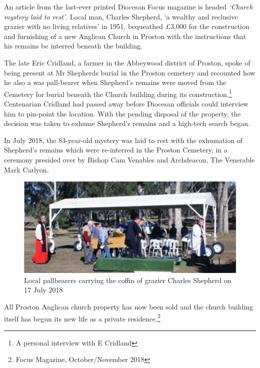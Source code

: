 An article from the last-ever printed Diocesan Focus magazine is headed \emph{`Church mystery laid to rest'}. Local man, Charles Shepherd, `a wealthy and reclusive grazier with no living relatives' in 1951, bequeathed \pounds3,000 for the construction and furnishing of a new Anglican Church in Proston with the instructions that his remains be interred beneath the building.



The late Eric Cridland, a farmer in the Abbeywood district of Proston, spoke of being present at Mr Shepherds burial in the Proston cemetery and recounted how he also a was pall-bearer when Shepherd's remains were moved from the Cemetery for burial beneath the Church building during its construction.\footnote{A personal interview with E Cridland} Centenarian Cridland had passed away before Diocesan officials could interview him to pin-point the location. With the pending disposal of the property, the decision was taken to exhume Shepherd's remains and a high-tech search began.


In July 2018, the 83-year-old mystery was laid to rest with the exhumation of Shepherd's remains which were re-interred in the Proston Cemetery, in a ceremony presided over by Bishop Cam Venables and Archdeacon, The Venerable Mark Carlyon.









\begin{figure}[!htb]
\begin{center}
\includegraphics[width=1.\textwidth,center]{../images/charlesShepherd.jpg}
\caption{Local pallbearers carrying the coffin of grazier Charles Shepherd on 17 July 2018}
\end{center}
\end{figure}




All Proston Anglican church property has now been sold and the church building itself has begun its new life as a private residence.\footnote{Focus Magazine, October/November 2018}


